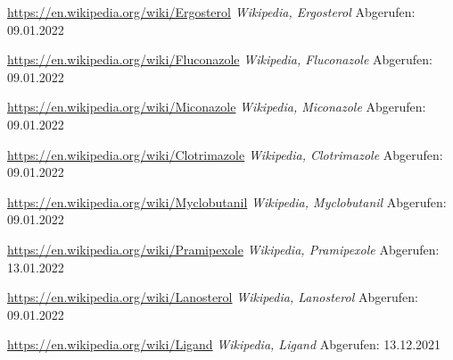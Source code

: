 \begin{thebibliography}{9}
\url{https://en.wikipedia.org/wiki/Ergosterol} \emph{Wikipedia, Ergosterol}
Abgerufen: 09.01.2022

\url{https://en.wikipedia.org/wiki/Fluconazole} \emph{Wikipedia, Fluconazole}
Abgerufen: 09.01.2022

\url{https://en.wikipedia.org/wiki/Miconazole} \emph{Wikipedia, Miconazole}
Abgerufen: 09.01.2022

\url{https://en.wikipedia.org/wiki/Clotrimazole} \emph{Wikipedia, Clotrimazole}
Abgerufen: 09.01.2022

\url{https://en.wikipedia.org/wiki/Myclobutanil} \emph{Wikipedia, Myclobutanil}
Abgerufen: 09.01.2022

\url{https://en.wikipedia.org/wiki/Pramipexole} \emph{Wikipedia, Pramipexole}
Abgerufen: 13.01.2022

\url{https://en.wikipedia.org/wiki/Lanosterol} \emph{Wikipedia, Lanosterol}
Abgerufen: 09.01.2022

\url{https://en.wikipedia.org/wiki/Ligand} \emph{Wikipedia, Ligand}
Abgerufen: 13.12.2021

\end{thebibliography}